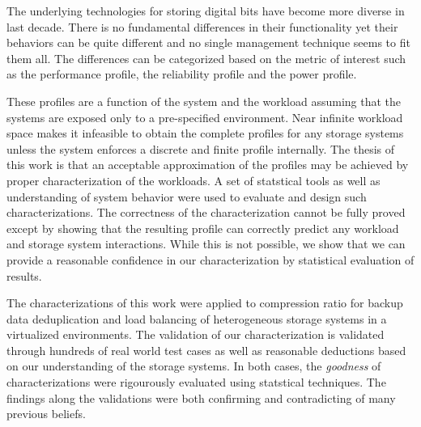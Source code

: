 
The underlying technologies for storing digital bits have become more diverse in last decade. 
There is no fundamental differences in their functionality yet their behaviors can be quite different and no single management technique seems to fit them all. 
The differences can be categorized based on the metric of interest such as the performance profile, the reliability profile and the power profile.
 
These profiles are a function of the system and the workload assuming that the systems are exposed only to a pre-specified environment. 
Near infinite workload space makes it infeasible to obtain the complete profiles for any storage systems unless the system enforces a discrete and finite profile internally.
The thesis of this work is that an acceptable approximation of the profiles may be achieved by proper characterization of the workloads. 
A set of statstical tools as well as understanding of system behavior were used to evaluate and design such characterizations. 
The correctness of the characterization cannot be fully proved except by showing that the resulting profile can correctly predict any workload and storage system interactions. 
While this is not possible, we show that we can provide a reasonable confidence in our characterization by statistical evaluation of results. 

The characterizations of this work were applied to compression ratio for backup data deduplication and load balancing of heterogeneous storage systems in a virtualized environments. 
The validation of our characterization is validated through hundreds of real world test cases as well as reasonable deductions based on our understanding of the storage systems. 
In both cases, the \emph{goodness} of characterizations were rigourously evaluated using statstical techniques.
The findings along the validations were both confirming and contradicting of many previous beliefs. 

